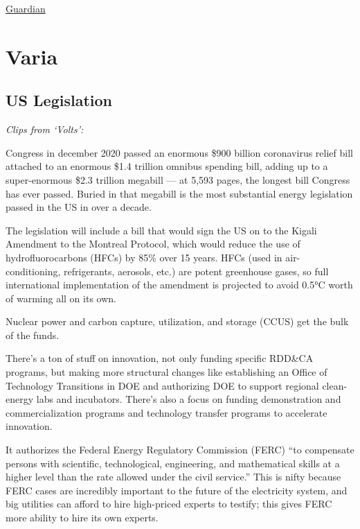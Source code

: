 \documentclass[
]{book}
\begin{document}
\href{https://www.theguardian.com/environment/2021/mar/16/good-vibrations-bladeless-turbines-could-bring-wind-power-to-your-home}{Guardian}

\hypertarget{varia}{%
\chapter{Varia}\label{varia}}

\hypertarget{us-legislation}{%
\section{US Legislation}\label{us-legislation}}

\emph{Clips from `Volts':}

Congress in december 2020 passed an enormous \$900 billion coronavirus relief bill attached to an enormous \$1.4 trillion omnibus spending bill, adding up to a super-enormous \$2.3 trillion megabill --- at 5,593 pages, the longest bill Congress has ever passed.
Buried in that megabill is the most substantial energy legislation passed in the US in over a decade.

The legislation will include a bill that would sign the US on to the Kigali Amendment to the Montreal Protocol, which would reduce the use of hydrofluorocarbons (HFCs) by 85\% over 15 years. HFCs (used in air-conditioning, refrigerants, aerosols, etc.) are potent greenhouse gases, so full international implementation of the amendment is projected to avoid 0.5°C worth of warming all on its own.

Nuclear power and carbon capture, utilization, and storage (CCUS) get the bulk of the funds.

There's a ton of stuff on innovation, not only funding specific RDD\&CA programs, but making more structural changes like establishing an Office of Technology Transitions in DOE and authorizing DOE to support regional clean-energy labs and incubators. There's also a focus on funding demonstration and commercialization programs and technology transfer programs to accelerate innovation.

It authorizes the Federal Energy Regulatory Commission (FERC) ``to compensate persons with scientific, technological, engineering, and mathematical skills at a higher level than the rate allowed under the civil service.'' This is nifty because FERC cases are incredibly important to the future of the electricity system, and big utilities can afford to hire high-priced experts to testify; this gives FERC more ability to hire its own experts.
\end{document}
